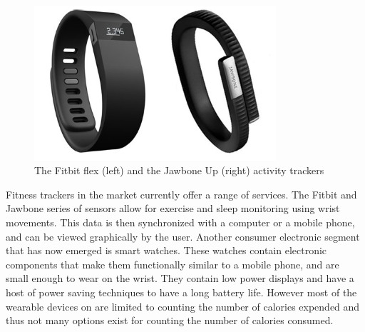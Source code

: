 \begin{figure}
\begin{center}
\includegraphics[width=0.8\textwidth]{images/JawFit.png}
\caption{The Fitbit flex (left) and the Jawbone Up (right) activity trackers}
\label{fig:FitbitJawbone}

\end{center}
\end{figure}
Fitness trackers in the market currently offer a range of services. The Fitbit \cite{Web:FitBitOfficial} and Jawbone\cite{Web:JawBoneWebsite} series of sensors allow for exercise and sleep monitoring using wrist movements. This data is then synchronized with a computer or a mobile phone, and can be viewed graphically by the user. Another consumer electronic segment that has now emerged is smart watches. These watches contain electronic components that make them functionally similar to a mobile phone, and are small enough to wear on the wrist. They contain low power displays and have a host of power saving techniques to have a long battery life. However most of the wearable devices on are limited to counting the number of calories expended and thus not many options exist for counting the number of calories consumed.

